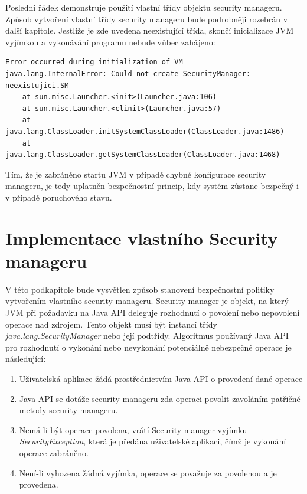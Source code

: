 Poslední řádek demonstruje použití vlastní třídy objektu security manageru. Způsob vytvoření vlastní třídy security manageru bude podrobněji rozebrán v další kapitole. Jestliže je zde uvedena neexistující třída, skončí inicializace JVM vyjímkou a vykonávání programu nebude vůbec zahájeno:

\begin{verbatim}
Error occurred during initialization of VM
java.lang.InternalError: Could not create SecurityManager: neexistujici.SM
    at sun.misc.Launcher.<init>(Launcher.java:106)
    at sun.misc.Launcher.<clinit>(Launcher.java:57)
    at java.lang.ClassLoader.initSystemClassLoader(ClassLoader.java:1486)
    at java.lang.ClassLoader.getSystemClassLoader(ClassLoader.java:1468)
\end{verbatim}

Tím, že je zabráněno startu JVM v případě chybné konfigurace security manageru, je tedy uplatněn bezpečnostní princip, kdy systém zůstane bezpečný i v případě poruchového stavu.

\section{Implementace vlastního Security manageru}

V této podkapitole bude vysvětlen způsob stanovení bezpečnostní politiky vytvořením vlastního security manageru.
Security manager je objekt, na který JVM při požadavku na Java API deleguje rozhodnutí o povolení nebo nepovolení operace nad zdrojem.
Tento objekt musí být instancí třídy {\it java.lang.SecurityManager} nebo její podtřídy. \cite{tutorialsTSM}
Algoritmus používaný Java API pro rozhodnutí o vykonání nebo nevykonání potenciálně nebezpečné operace je následující: \cite[4.1.1]{oaks}

\begin{enumerate}
  \item Uživatelská aplikace žádá prostřednictvím Java API o provedení dané operace
  \item Java API se dotáže security manageru zda operaci povolit zavoláním patřičné metody security manageru.
  \item Nemá-li být operace povolena, vrátí Security manager vyjímku {\it SecurityException}, která je předána uživatelské aplikaci, čímž je vykonání operace zabráněno.
  \item Není-li vyhozena žádná vyjímka, operace se považuje za povolenou a je provedena.
\end{enumerate}

